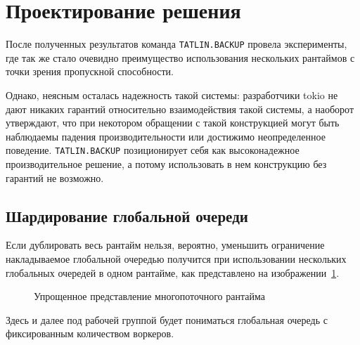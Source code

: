 
\section{Проектирование решения}

После полученных результатов команда \verb|TATLIN.BACKUP| провела эксперименты, где так же стало очевидно преимущество использования нескольких рантаймов с точки зрения пропускной способности.

Однако, неясным осталась надежность такой системы: разработчики tokio не дают никаких гарантий относительно взаимодействия такой системы, а наоборот утверждают, что при некотором обращении с такой конструкцией могут быть наблюдаемы падения производительности или достижимо неопределенное поведение. \verb|TATLIN.BACKUP| позиционирует себя как высоконадежное производительное решение, а потому использовать в нем конструкцию без гарантий не возможно.

\subsection{Шардирование глобальной очереди}

Если дублировать весь рантайм нельзя, вероятно, уменьшить ограничение накладываемое глобальной очередью получится при использовании нескольких глобальных очередей в одном рантайме, как представлено на изображении~\ref{fig:tokio:duplicated_arch}.

\begin{figure}[H]
    \begin{center}
    \end{center}

    \caption{Упрощенное представление многопоточного рантайма}
    \label{fig:tokio:duplicated_arch}
\end{figure}
Здесь и далее под рабочей группой будет пониматься глобальная очередь с фиксированным количеством воркеров.

